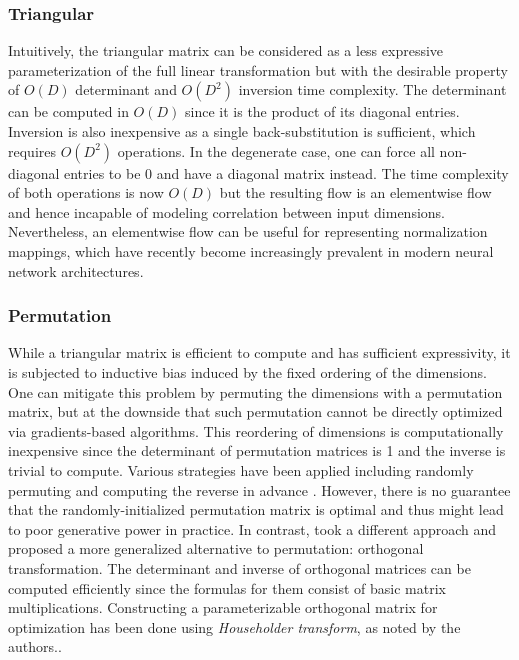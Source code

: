 \subsubsection{Triangular}

Intuitively, the triangular matrix can be considered as a less expressive
parameterization of the full linear transformation but with the desirable
property of $O(D)$ determinant and $O(D^2)$ inversion time complexity. The
determinant can be computed in $O(D)$ since it is the product of its diagonal
entries. Inversion is also inexpensive as a single back-substitution is
sufficient, which requires $O(D^2)$ operations. In the degenerate case, one can
force all non-diagonal entries to be $0$ and have a diagonal matrix instead. The
time complexity of both operations is now $O(D)$ but the resulting flow is an
elementwise flow and hence incapable of modeling correlation between input
dimensions. Nevertheless, an elementwise flow can be useful for representing
normalization mappings, which have recently become increasingly prevalent in
modern neural network architectures.

\subsubsection{Permutation} While a triangular matrix is efficient to compute
and has sufficient expressivity, it is subjected to inductive bias induced by
the fixed ordering of the dimensions. One can mitigate this problem by permuting
the dimensions with a permutation matrix, but at the downside that such
permutation cannot be directly optimized via gradients-based algorithms. This
reordering of dimensions is computationally inexpensive since the determinant of
permutation matrices is 1 and the inverse is trivial to compute. Various
strategies have been applied including randomly permuting and computing the
reverse in advance \citep{dinhDensityEstimationUsing2017,
kingmaGlowGenerativeFlow2018}. However, there is no guarantee that the
randomly-initialized permutation matrix is optimal and thus might lead to poor
generative power in practice. In contrast,
\citep{tomczakImprovingVariationalAutoEncoders2017} took a different approach
and proposed a more generalized alternative to permutation: orthogonal
transformation. The determinant and inverse of orthogonal matrices can be
computed efficiently since the formulas for them consist of basic matrix
multiplications. Constructing a parameterizable orthogonal matrix for
optimization has been done using \textit{Householder transform}, as noted by the
authors..

